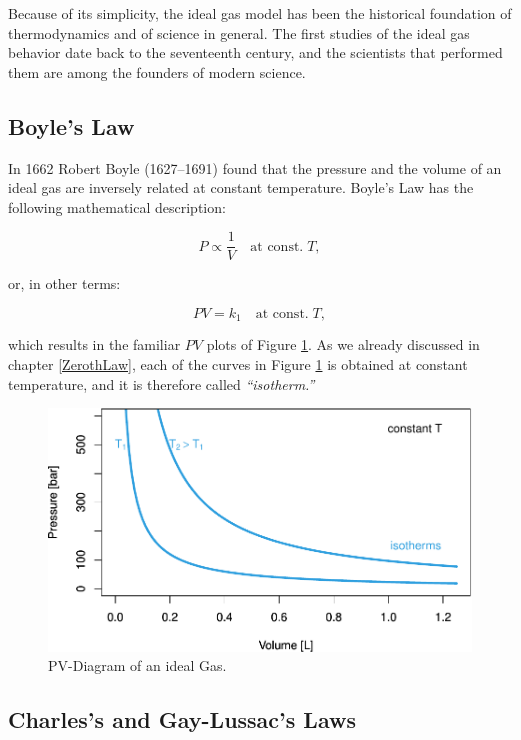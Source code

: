\documentclass[
  9pt,
]{extbook}
\theoremstyle{definition}
\theoremstyle{definition}
\theoremstyle{definition}
\theoremstyle{definition}
\theoremstyle{remark}
\begin{document}
Because of its simplicity, the ideal gas model has been the historical foundation of thermodynamics and of science in general. The first studies of the ideal gas behavior date back to the seventeenth century, and the scientists that performed them are among the founders of modern science.

\subsection{Boyle's Law}\label{boyles-law}

In 1662 Robert Boyle (1627--1691) found that the pressure and the volume of an ideal gas are inversely related at constant temperature. Boyle's Law has the following mathematical description:

\begin{equation}
P\propto\frac{1}{V}\quad\text{at const.}\;T,
\label{eq:boylelaw1}
\end{equation}

or, in other terms:

\begin{equation}
PV=k_1\quad\text{at const.}\;T,
\label{eq:boylelaw2}
\end{equation}

which results in the familiar \(PV\) plots of Figure \ref{fig:FigPVideal}. As we already discussed in chapter \ref{ZerothLaw}, each of the curves in Figure \ref{fig:FigPVideal} is obtained at constant temperature, and it is therefore called \emph{``isotherm.''}

\begin{figure}

{\centering \includegraphics[width=0.7\linewidth]{pchem1_files/figure-latex/FigPVideal-1} 

}

\caption{PV-Diagram of an ideal Gas.}\label{fig:FigPVideal}
\end{figure}

\subsection{Charles's and Gay-Lussac's Laws}\label{charless-and-gay-lussacs-laws}
\end{document}
